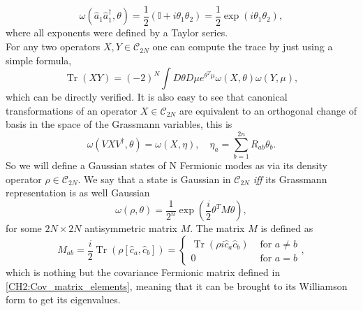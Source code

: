 \begin{equation}
\omega(\hat{a}_1\hat{a}_1^{\dagger}, \theta)=\frac{1}{2} \left(\mathbb{I}+ i \theta_1\theta_2\right) =\frac{1}{2}  \exp \left(i \theta_1\theta_2\right),
\label{CH2:Gaussian_Grassmann}
\end{equation}
where all exponents were defined by a Taylor series.\\
\newline
For any two operators $X,Y\in \mathcal{C}_{2N}$ one can compute the trace by just using a simple formula,
\begin{equation}
\operatorname{Tr}(X Y)=(-2)^{N} \int D \theta D \mu e^{\theta^{T} \mu} \omega(X, \theta) \omega(Y, \mu),
\label{CH2:Trace_grassmann_operators}
\end{equation}
 which can be directly verified.
It is also easy to see that canonical transformations of an operator $X\in\mathcal{C}_{2N}$ are equivalent to an orthogonal change of basis in the space of the Grassmann variables, this is
\begin{equation}
\omega\left(V X V^{\dagger}, \theta\right)=\omega(X, \eta), \quad \eta_{a}=\sum_{b=1}^{2 n} R_{a b} \theta_{b}.
\label{CH2:Transformations_in_Grassmann_Variables}
\end{equation}
So we will define  a Gaussian states of N Fermionic modes as via its density operator $\rho\in\mathcal{C}_{2N}$. We say that a state is Gaussian in  $\mathcal{C}_{2N}$ \textit{iff} its Grassmann representation is as well Gaussian
\begin{equation}
\omega(\rho, \theta)=\frac{1}{2^{n}} \exp \left(\frac{i}{2} \theta^{T} M \theta\right),
\end{equation}
for some $2N\times 2N$ antisymmetric matrix $M$. The matrix $M$ is defined as 
\begin{equation}
M_{a b}=\frac{i}{2} \operatorname{Tr}\left(\rho\left[\hat{c}_{a}, \hat{c}_{b}\right]\right)=\left\{\begin{aligned}
\operatorname{Tr}\left(\rho i \hat{c}_{a} \hat{c}_{b}\right) & \text { for } a \neq b \\
0 & \text { for } a=b
\end{aligned}\right. ,
\end{equation}
which is nothing but the covariance Fermionic matrix defined in \eqref{CH2:Cov_matrix_elements}, meaning that it can be brought to its Williamson form to get its eigenvalues.\\
